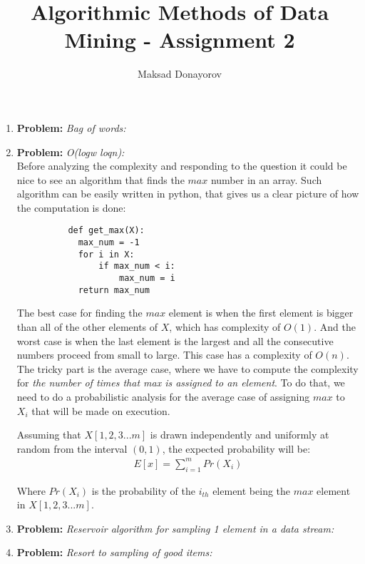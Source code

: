 \documentclass[11pt,a4paper,english]{article}
\title{Algorithmic Methods of Data Mining - Assignment 2}
\author{Maksad Donayorov}
\begin{document}
    \maketitle

    \begin{enumerate}
      \item \textbf{Problem:} \textit{Bag of words:}

      \item \textbf{Problem:} \textit{O(logw loqn):} \\
        Before analyzing the complexity and responding to the question it could be nice to see an algorithm that finds the $max$ number in an array. Such algorithm can be easily written in python, that gives us a clear picture of how the computation is done:
        \begin{verbatim}
          def get_max(X):
            max_num = -1
            for i in X:
                if max_num < i:
                    max_num = i
            return max_num
        \end{verbatim}

        The best case for finding the $max$ element is when the first element is bigger than all of the other elements of $X$, which has complexity of $O(1)$. And the worst case is when the last element is the largest and all the consecutive numbers proceed from small to large. This case has a complexity of $O(n)$. The tricky part is the average case, where we have to compute the complexity for \textit{the number of times that max is assigned to an element}. To do that, we need to do a probabilistic analysis for the average case of assigning $max$ to $X_i$ that will be made on execution.

        Assuming that $X[1,2,3...m]$ is drawn independently and uniformly at random from the interval $(0,1)$, the expected probability will be:
        \begin{align*}
          E[x] = \sum\limits_{i=1}^{m} Pr(X_i)
        \end{align*}

        Where $Pr(X_i)$ is the probability of the $i_{th}$ element being the $max$ element in $X[1,2,3...m]$.

      \item \textbf{Problem:} \textit{Reservoir algorithm for sampling 1 element in a data stream:}

      \item \textbf{Problem:} \textit{Resort to sampling of good items:}
    \end{enumerate}
\end{document}
